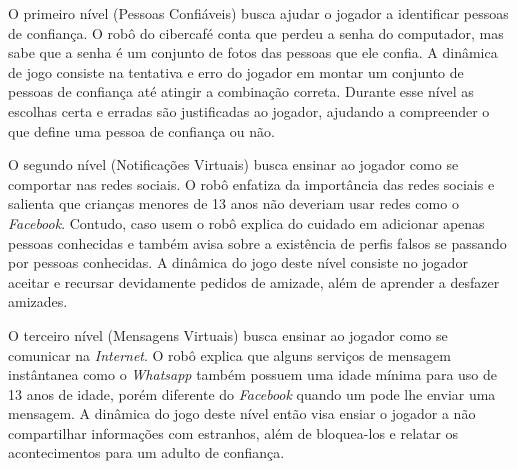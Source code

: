 O primeiro nível (Pessoas Confiáveis) busca ajudar o jogador a identificar pessoas de confiança. O robô do cibercafé conta que perdeu a senha do computador, mas sabe que a senha é um conjunto de fotos das pessoas que ele confia. A dinâmica de jogo consiste na tentativa e erro do jogador em montar um conjunto de pessoas de confiança até atingir a combinação correta. Durante esse nível as escolhas certa e erradas são justificadas ao jogador, ajudando a compreender o que define uma pessoa de confiança ou não. 

O segundo nível (Notificações Virtuais) busca ensinar ao jogador como se comportar nas redes sociais. O robô enfatiza da importância das redes sociais e salienta que crianças menores de 13 anos não deveriam usar redes como o \textit{Facebook}. Contudo, caso usem o robô explica do cuidado em adicionar apenas pessoas conhecidas e também avisa sobre a existência de perfis falsos se passando por pessoas conhecidas. A dinâmica do jogo deste nível consiste no jogador aceitar e recursar devidamente pedidos de amizade, além de aprender a desfazer amizades. %

O terceiro nível (Mensagens Virtuais) busca ensinar ao jogador como se comunicar na \textit{Internet}. O robô explica que alguns serviços de mensagem instântanea como o \textit{Whatsapp} também possuem uma idade mínima para uso de 13 anos de idade, porém diferente do \textit{Facebook} quando um pode lhe enviar uma mensagem. A dinâmica do jogo deste nível então visa ensiar o jogador a não compartilhar informações com estranhos, além de bloquea-los e relatar os acontecimentos para um adulto de confiança. 

